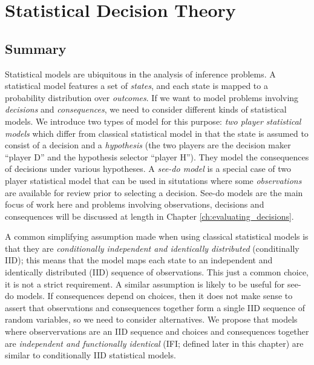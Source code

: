 
\chapter{Statistical Decision Theory}\label{ch:sdt}


\section{Summary}

Statistical models are ubiquitous in the analysis of inference problems. A statistical model features a set of \emph{states}, and each state is mapped to a probability distribution over \emph{outcomes}. If we want to model problems involving \emph{decisions} and \emph{consequences}, we need to consider different kinds of statistical models. We introduce two types of model for this purpose: \emph{two player statistical models} which differ from classical statistical model in that the state is assumed to consist of a decision and a \emph{hypothesis} (the two players are the decision maker ``player D'' and the hypothesis selector ``player H''). They model the consequences of decisions under various hypotheses. A \emph{see-do model} is a special case of two player statistical model that can be used in situtations where some \emph{observations} are available for review prior to selecting a decision. See-do models are the main focus of work here and problems involving observations, decisions and consequences will be discussed at length in Chapter \ref{ch:evaluating_decisions}.

A common simplifying assumption made when using classical statistical models is that they are \emph{conditionally independent and identically distributed} (conditinally IID); this means that the model maps each state to an independent and identically distributed (IID) sequence of observations. This just a common choice, it is not a strict requirement. A similar assumption is likely to be useful for see-do models. If consequences depend on choices, then it does not make sense to assert that observations and consequences together form a single IID sequence of random variables, so we need to consider alternatives. We propose that models where observervations are an IID sequence and choices and consequences together are \emph{independent and functionally identical} (IFI; defined later in this chapter) are similar to conditionally IID statistical models. 

